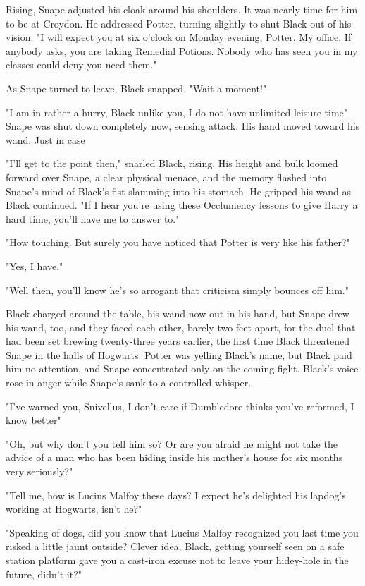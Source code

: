Rising, Snape adjusted his cloak around his shoulders. It was nearly time for him to be at Croydon. He addressed Potter, turning slightly to shut Black out of his vision. "I will expect you at six o'clock on Monday evening, Potter. My office. If anybody asks, you are taking Remedial Potions. Nobody who has seen you in my classes could deny you need them."

As Snape turned to leave, Black snapped, "Wait a moment!"

"I am in rather a hurry, Black{\el} unlike you, I do not have unlimited leisure time{\el}" Snape was shut down completely now, sensing attack. His hand moved toward his wand. Just in case{\el}

"I'll get to the point then," snarled Black, rising. His height and bulk loomed forward over Snape, a clear physical menace, and the memory flashed into Snape's mind of Black's fist slamming into his stomach. He gripped his wand as Black continued. "If I hear you're using these Occlumency lessons to give Harry a hard time, you'll have me to answer to."

"How touching. But surely you have noticed that Potter is very like his father?"

"Yes, I have."

"Well then, you'll know he's so arrogant that criticism simply bounces off him."

Black charged around the table, his wand now out in his hand, but Snape drew his wand, too, and they faced each other, barely two feet apart, for the duel that had been set brewing twenty-three years earlier, the first time Black threatened Snape in the halls of Hogwarts. Potter was yelling Black's name, but Black paid him no attention, and Snape concentrated only on the coming fight. Black's voice rose in anger while Snape's sank to a controlled whisper.

"I've warned you, Snivellus, I don't care if Dumbledore thinks you've reformed, I know better{\el}"

"Oh, but why don't you tell him so? Or are you afraid he might not take the advice of a man who has been hiding inside his mother's house for six months very seriously?"

"Tell me, how is Lucius Malfoy these days? I expect he's delighted his lapdog's working at Hogwarts, isn't he?"

"Speaking of dogs, did you know that Lucius Malfoy recognized you last time you risked a little jaunt outside? Clever idea, Black, getting yourself seen on a safe station platform{\el} gave you a cast-iron excuse not to leave your hidey-hole in the future, didn't it?"

